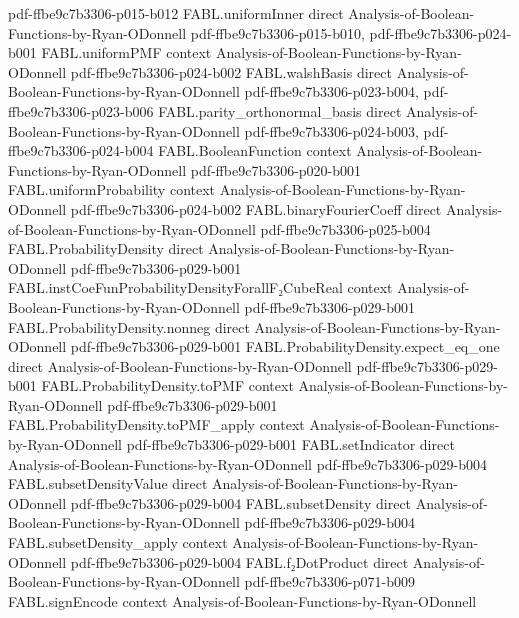 \begin{theorem}
  {pdf-ffbe9c7b3306-p015-b012}
\proofstep
  {FABL.uniformInner}
  {direct}
  {Analysis-of-Boolean-Functions-by-Ryan-ODonnell}
  {pdf-ffbe9c7b3306-p015-b010,
    pdf-ffbe9c7b3306-p024-b001}
\proofstep
  {FABL.uniformPMF}
  {context}
  {Analysis-of-Boolean-Functions-by-Ryan-ODonnell}
  {pdf-ffbe9c7b3306-p024-b002}
\proofstep
  {FABL.walshBasis}
  {direct}
  {Analysis-of-Boolean-Functions-by-Ryan-ODonnell}
  {pdf-ffbe9c7b3306-p023-b004,
    pdf-ffbe9c7b3306-p023-b006}
\proofstep
  {FABL.parity_orthonormal_basis}
  {direct}
  {Analysis-of-Boolean-Functions-by-Ryan-ODonnell}
  {pdf-ffbe9c7b3306-p024-b003,
    pdf-ffbe9c7b3306-p024-b004}
\proofstep
  {FABL.BooleanFunction}
  {context}
  {Analysis-of-Boolean-Functions-by-Ryan-ODonnell}
  {pdf-ffbe9c7b3306-p020-b001}
\proofstep
  {FABL.uniformProbability}
  {context}
  {Analysis-of-Boolean-Functions-by-Ryan-ODonnell}
  {pdf-ffbe9c7b3306-p024-b002}
\proofstep
  {FABL.binaryFourierCoeff}
  {direct}
  {Analysis-of-Boolean-Functions-by-Ryan-ODonnell}
  {pdf-ffbe9c7b3306-p025-b004}
\proofstep
  {FABL.ProbabilityDensity}
  {direct}
  {Analysis-of-Boolean-Functions-by-Ryan-ODonnell}
  {pdf-ffbe9c7b3306-p029-b001}
\proofstep
  {FABL.instCoeFunProbabilityDensityForallF₂CubeReal}
  {context}
  {Analysis-of-Boolean-Functions-by-Ryan-ODonnell}
  {pdf-ffbe9c7b3306-p029-b001}
\proofstep
  {FABL.ProbabilityDensity.nonneg}
  {direct}
  {Analysis-of-Boolean-Functions-by-Ryan-ODonnell}
  {pdf-ffbe9c7b3306-p029-b001}
\proofstep
  {FABL.ProbabilityDensity.expect_eq_one}
  {direct}
  {Analysis-of-Boolean-Functions-by-Ryan-ODonnell}
  {pdf-ffbe9c7b3306-p029-b001}
\proofstep
  {FABL.ProbabilityDensity.toPMF}
  {context}
  {Analysis-of-Boolean-Functions-by-Ryan-ODonnell}
  {pdf-ffbe9c7b3306-p029-b001}
\proofstep
  {FABL.ProbabilityDensity.toPMF_apply}
  {context}
  {Analysis-of-Boolean-Functions-by-Ryan-ODonnell}
  {pdf-ffbe9c7b3306-p029-b001}
\proofstep
  {FABL.setIndicator}
  {direct}
  {Analysis-of-Boolean-Functions-by-Ryan-ODonnell}
  {pdf-ffbe9c7b3306-p029-b004}
\proofstep
  {FABL.subsetDensityValue}
  {direct}
  {Analysis-of-Boolean-Functions-by-Ryan-ODonnell}
  {pdf-ffbe9c7b3306-p029-b004}
\proofstep
  {FABL.subsetDensity}
  {direct}
  {Analysis-of-Boolean-Functions-by-Ryan-ODonnell}
  {pdf-ffbe9c7b3306-p029-b004}
\proofstep
  {FABL.subsetDensity_apply}
  {context}
  {Analysis-of-Boolean-Functions-by-Ryan-ODonnell}
  {pdf-ffbe9c7b3306-p029-b004}
\proofstep
  {FABL.f₂DotProduct}
  {direct}
  {Analysis-of-Boolean-Functions-by-Ryan-ODonnell}
  {pdf-ffbe9c7b3306-p071-b009}
\proofstep
  {FABL.signEncode}
  {context}
  {Analysis-of-Boolean-Functions-by-Ryan-ODonnell}

\end{theorem}

